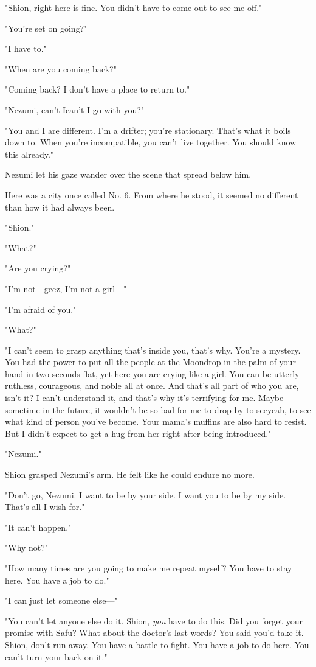 "Shion, right here is fine. You didn't have to come out to see me off."

"\el You're set on going?"

"I have to."

"When are you coming back?"

"Coming back? I don't have a place to return to."

"Nezumi, can't I\el can't I go with you?"

"You and I are different. I'm a drifter; you're stationary. That's what
it boils down to. When you're incompatible, you can't live together. You
should know this already."

Nezumi let his gaze wander over the scene that spread below him.

Here was a city once called No. 6. From where he stood, it seemed no
different than how it had always been.

"Shion."

"What?"

"Are you crying?"

"I'm not---geez, I'm not a girl---"

"I'm afraid of you."

"What?"

"I can't seem to grasp anything that's inside you, that's why. You're a
mystery. You had the power to put all the people at the Moondrop in the
palm of your hand in two seconds flat, yet here you are crying like a
girl. You can be utterly ruthless, courageous, and noble all at once.
And that's all part of who you are, isn't it? I can't understand it, and
that's why it's terrifying for me. Maybe sometime in the future, it
wouldn't be so bad for me to drop by to see\el yeah, to see what kind of
person you've become. Your mama's muffins are also hard to resist. But I
didn't expect to get a hug from her right after being introduced."

"Nezumi."

Shion grasped Nezumi's arm. He felt like he could endure no more.

"Don't go, Nezumi. I want to be by your side. I want you to be by my
side. That's all I wish for."

"It can't happen."

"Why not?"

"How many times are you going to make me repeat myself? You have to stay
here. You have a job to do."

"I can just let someone else---"

"You can't let anyone else do it. Shion, \emph{you} have to do this. Did you
forget your promise with Safu? What about the doctor's last words? You
said you'd take it. Shion, don't run away. You have a battle to fight.
You have a job to do here. You can't turn your back on it."

